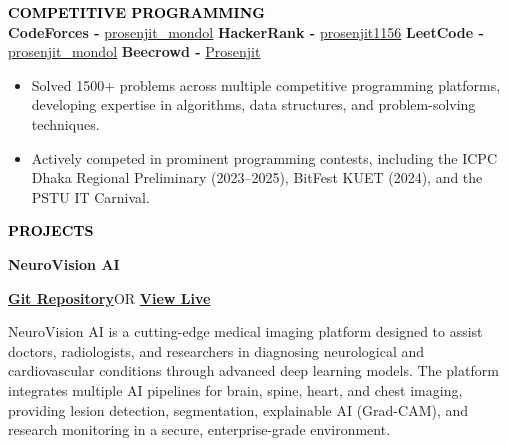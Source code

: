 \documentclass[a4paper]{article}
\begin{document}
    \vspace{4pt}

\textcolor{black}{\textbf{COMPETITIVE PROGRAMMING}}\vspace{-0.6em}\\\noindent{\color{black} \rule{\linewidth}{0.1mm}}
    \textbf{CodeForces -}
    \href{https://codeforces.com/profile/prosenjit_mondol}{prosenjit\_mondol}
   \textbf{ HackerRank -} \href{https://www.hackerrank.com/profile/prosenjit1156}{prosenjit1156}    \textbf{LeetCode
    -} \href{https://leetcode.com/u/prosenjit_mondol/}{prosenjit\_mondol}  \textbf{Beecrowd
    -} \href{https://judge.beecrowd.com/en/profile/793803}{Prosenjit}
   \begin{itemize}
    \item Solved 1500+ problems across multiple competitive programming platforms, developing expertise in algorithms, data structures, and problem-solving techniques.
    \item Actively competed in prominent programming contests, including the ICPC Dhaka Regional Preliminary (2023--2025), BitFest KUET (2024), and the PSTU IT Carnival.
\end{itemize}




    \vspace{4pt}

    
    \textcolor{black}{\textbf{PROJECTS}}\vspace{-0.6em}\\\noindent{\color{black} \rule{\linewidth}{0.1mm}}

    \begin{minipage}{0.6\textwidth}
        \begin{flushleft}
            \textbf{\large NeuroVision AI}
        \end{flushleft}
    \end{minipage}
    \begin{minipage}{0.4\textwidth}
        \begin{flushright}
           \href{https://github.com/pronad1/NeuroVision}{\textbf{\faGithub \hspace{0.1cm} Git Repository}}OR \href{https://reuse-hub-4b3f7.web.app/}{\textbf{\faPaperPlane\hspace{0.1cm}View Live}}
        \end{flushright}
    \end{minipage}
    NeuroVision AI is a cutting-edge medical imaging platform designed to assist doctors, radiologists, and researchers in diagnosing neurological and cardiovascular conditions through advanced deep learning models. The platform integrates multiple AI pipelines for brain, spine, heart, and chest imaging, providing lesion detection, segmentation, explainable AI (Grad-CAM), and research monitoring in a secure, enterprise-grade environment.
\end{document}

